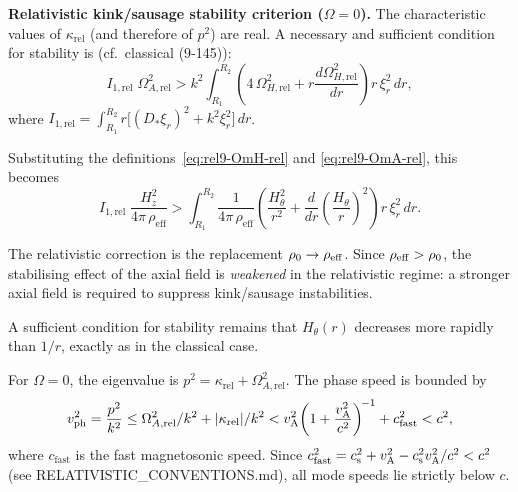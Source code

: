 \begin{relcorrection}
\textbf{Relativistic kink/sausage stability criterion ($\Omega = 0$).}
The characteristic values of $\kappa_{\mathrm{rel}}$ (and therefore
of $p^{2}$) are real.  A necessary and sufficient condition for
stability is (cf.\ classical (9-145)):
\begin{equation}
  I_{1,\mathrm{rel}}\;\Omega_{A,\mathrm{rel}}^{2}
  > k^{2}\!\int_{R_1}^{R_2}
    \!\left(4\,\Omega_{H,\mathrm{rel}}^{2}
    + r\frac{d\Omega_{H,\mathrm{rel}}^{2}}{dr}\right)
    r\,\xi_r^{2}\,dr,
  \label{eq:rel9-145-rel}
\end{equation}
where $I_{1,\mathrm{rel}} = \int_{R_1}^{R_2}\!
r\bigl[(D_{*}\xi_r)^{2} + k^{2}\xi_r^{2}\bigr]\,dr$.

Substituting the definitions~\eqref{eq:rel9-OmH-rel} and
\eqref{eq:rel9-OmA-rel}, this becomes
\begin{equation}
  I_{1,\mathrm{rel}}\;
  \frac{H_z^{2}}{4\pi\,\rho_{\mathrm{eff}}}
  > \int_{R_1}^{R_2}
    \frac{1}{4\pi\,\rho_{\mathrm{eff}}}
    \left(\frac{H_\theta^{2}}{r^{2}}
    + \frac{d}{dr}\!\left(\frac{H_\theta}{r}\right)^{\!2}\right)
    r\,\xi_r^{2}\,dr.
  \label{eq:rel9-146-rel}
\end{equation}

The relativistic correction is the replacement
$\rho_0 \to \rho_{\mathrm{eff}}$.  Since
$\rho_{\mathrm{eff}} > \rho_0$, the stabilising effect of
the axial field is \emph{weakened} in the relativistic regime:
a stronger axial field is required to suppress kink/sausage
instabilities.

A sufficient condition for stability remains that $H_\theta(r)$
decreases more rapidly than $1/r$, exactly as in the classical case.
\end{relcorrection}

\begin{causalitycheck}
For $\Omega = 0$, the eigenvalue is $p^{2}
= \kappa_{\mathrm{rel}} + \Omega_{A,\mathrm{rel}}^{2}$.
The phase speed is bounded by
\begin{equation}
  v_{\mathrm{ph}}^{2}
  = \frac{p^{2}}{k^{2}}
  \le \Omega_{A,\mathrm{rel}}^{2}/k^{2}
      + |\kappa_{\mathrm{rel}}|/k^{2}
  < v_{\mathrm{A}}^{2}\!\left(1 + \frac{v_{\mathrm{A}}^{2}}{c^{2}}\right)^{\!-1}
    + c_{\mathrm{fast}}^{2}
  < c^{2},
  \label{eq:rel9-causality-85}
\end{equation}
where $c_{\mathrm{fast}}$ is the fast magnetosonic speed.
Since $c_{\mathrm{fast}}^{2} = c_{\mathrm{s}}^{2} + v_{\mathrm{A}}^{2}
- c_{\mathrm{s}}^{2}v_{\mathrm{A}}^{2}/c^{2} < c^{2}$
(see RELATIVISTIC\_CONVENTIONS.md), all mode speeds lie
strictly below $c$.
\end{causalitycheck}

